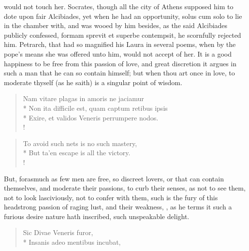 would not touch her. Socrates, though all the city of Athens supposed
him to dote upon fair Alcibiades, yet when he had an opportunity,
solus cum solo to lie in the chamber with, and was wooed by him
besides, as the said Alcibiades publicly confessed, formam
sprevit et superbe contempsit, he scornfully rejected him. Petrarch,
that had so magnified his Laura in several poems, when by the pope's
means she was offered unto him, would not accept of her. It is a
good happiness to be free from this passion of love, and great
discretion it argues in such a man that he can so contain himself; but
when thou art once in love, to moderate thyself (as he saith) is a
singular point of wisdom.
%
\begin{latin}
\begin{verse}%
Nam vitare plagas in amoris ne jaciamur\\*
Non ita difficile est, quam captum retibus ipsis\\*
Exire, et validos Veneris perrumpere nodos.\\!
\end{verse}%
\end{latin}
\translationrule%
\begin{verse}%
To avoid such nets is no such mastery,\\*
But ta'en escape is all the victory.\\!
\end{verse}%
%

But, forasmuch as few men are free, so discreet lovers, or that can
contain themselves, and moderate their passions, to curb their senses,
as not to see them, not to look lasciviously, not to confer with them,
such is the fury of this headstrong passion of raging lust, and their
weakness, , as he terms it such
a furious desire nature hath inscribed, such unspeakable delight.

\begin{latin}
\begin{verse}%
Sic Divae Veneris furor,\\*
Insanis adeo mentibus incubat,
\end{verse}%
\end{latin}

